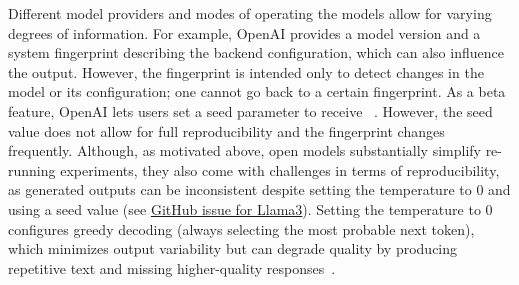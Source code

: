 Different model providers and modes of operating the models allow for varying degrees of information.
For example, OpenAI provides a model version and a system fingerprint describing the backend configuration, which can also influence the output.
However, the fingerprint is intended only to detect changes in the model or its configuration; one cannot go back to a certain fingerprint.
As a beta feature, OpenAI lets users set a seed parameter to receive ~\cite{OpenAI23}.
However, the seed value does not allow for full reproducibility and the fingerprint changes frequently. 
Although, as motivated above, open models substantially simplify re-running experiments, they also come with challenges in terms of reproducibility, as generated outputs can be inconsistent despite setting the temperature to 0 and using a seed value (see \href{https://github.com/ollama/ollama/issues/5321}{GitHub issue for Llama3}).
Setting the temperature to 0 configures greedy decoding (always selecting the most probable next token), which minimizes output variability but can degrade quality by producing repetitive text and missing higher-quality responses~\cite{DBLP:conf/iclr/HoltzmanBDFC20}.

